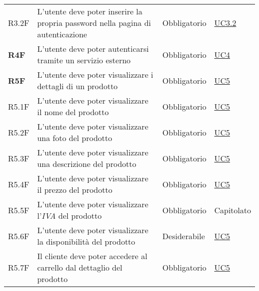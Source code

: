 \begin{center}
\begin{longtable}[!h]{p{50px} p{210px} p{80px} p{50px}}
        R3.2F                                 & L'utente deve poter inserire la propria password nella pagina di autenticazione                     & Obbligatorio             & \hyperref[sec:UC3.2]{UC3.2}                  \\
        \textbf{R4F}                          & L'utente deve poter autenticarsi tramite un servizio esterno                                        & Obbligatorio             & \hyperref[sec:UC4]{UC4}                      \\
        \textbf{R5F}                          & L'utente deve poter visualizzare i dettagli di un prodotto                                          & Obbligatorio             & \hyperref[sec:UC5]{UC5}                      \\
        R5.1F                                 & L'utente deve poter visualizzare il nome del prodotto                                               & Obbligatorio             & \hyperref[sec:UC5]{UC5}                      \\
        R5.2F                                 & L'utente deve poter visualizzare una foto del prodotto                                              & Obbligatorio             & \hyperref[sec:UC5]{UC5}                      \\
        R5.3F                                 & L'utente deve poter visualizzare una descrizione del prodotto                                       & Obbligatorio             & \hyperref[sec:UC5]{UC5}                      \\
        R5.4F                                 & L'utente deve poter visualizzare il prezzo del prodotto                                             & Obbligatorio             & \hyperref[sec:UC5]{UC5}                      \\
        R5.5F                                 & L'utente deve poter visualizzare l'\textit{IVA} del prodotto                                        & Obbligatorio             & Capitolato                                   \\
        R5.6F                                 & L'utente deve poter visualizzare la disponibilità del prodotto                                      & Desiderabile             & \hyperref[sec:UC5]{UC5}                      \\
        R5.7F                                 & Il cliente deve poter accedere al carrello dal dettaglio del prodotto                               & Obbligatorio             & \hyperref[sec:UC5]{UC5}                      \\

\end{longtable}
\end{center}
